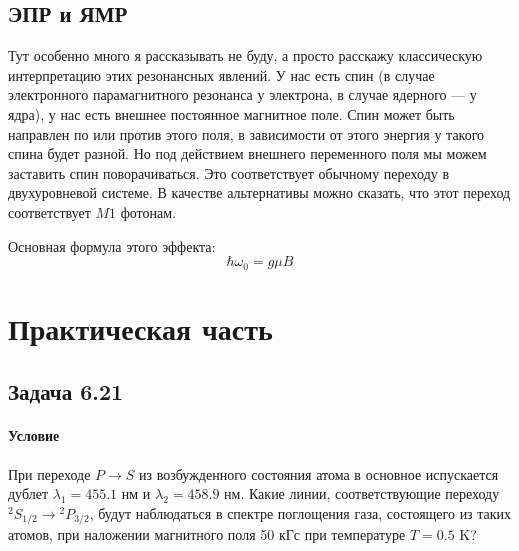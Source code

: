 \documentclass[12pt]{article}
\begin{document}
\subsection{ЭПР и ЯМР}
Тут особенно много я рассказывать не буду, а просто расскажу классическую интерпретацию этих резонансных явлений. У нас есть спин (в случае электронного парамагнитного резонанса у электрона, в случае ядерного --- у ядра), у нас есть внешнее постоянное магнитное поле. Спин может быть направлен по или против этого поля, в зависимости от этого энергия у такого спина будет разной. Но под действием внешнего переменного поля мы можем заставить спин поворачиваться. Это соответствует обычному переходу в двухуровневой системе. В качестве альтернативы можно сказать, что этот переход соответствует $M1$ фотонам.

\vspace{1em} \noindent
Основная формула этого эффекта:
\begin{equation*}
    \hbar \omega_0 = g\mu B
\end{equation*}


\section{Практическая часть}
\subsection{Задача 6.21}
\label{task_6.21}
\paragraph{Условие} При переходе $P \rightarrow S$ из возбужденного состояния атома в основное испускается дублет $\lambda_1 = 455.1$ нм и $\lambda_2 = 458.9$ нм. Какие линии, соответствующие переходу ${}^2S_{1/2} \rightarrow {}^2P_{3/2}$, будут наблюдаться в спектре поглощения газа, состоящего из таких атомов, при наложении магнитного поля 50 кГс при температуре $T=0.5$ K?
\end{document}
